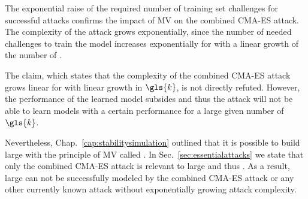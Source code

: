 The exponential raise of the required number of training set challenges for successful attacks confirms the impact of \ac{MV} on the combined \ac{CMA-ES} attack.
The complexity of the attack grows exponentially, since the number of needed challenges to train the model increases exponentially for \mxpufs with a linear growth of the number of \mpufs.

The claim, which states that the complexity of the combined \ac{CMA-ES} attack grows linear for \xpufs with linear growth in $\gls{k}$, is not directly refuted.
However, the performance of the learned model subsides and thus the attack will not be able to learn models with a certain performance for a large given number of $\gls{k}$.

Nevertheless, Chap.\ \ref{cap:stabilitysimulation} outlined that it is possible to build large \xpufs with the principle of \ac{MV} called \mxpufs.
In Sec.\ \ref{sec:essentialattacks} we state that only the combined \ac{CMA-ES} attack is relevant to large \xpufs and thus \mxpufs.
As a result, large \mxpufs can not be successfully modeled by the combined \ac{CMA-ES} attack or any other currently known attack without exponentially growing attack complexity.


